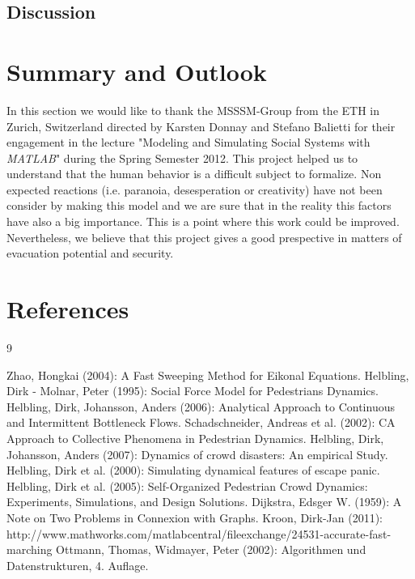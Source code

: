 \documentclass[11pt]{article}
\begin{document}

\subsection{Discussion}


\section{Summary and Outlook}

In this section we would like to thank the MSSSM-Group from the ETH in Zurich, Switzerland
directed by Karsten Donnay and Stefano Balietti for their engagement in the lecture
"Modeling and Simulating Social Systems with \textit{MATLAB}" during the Spring Semester 2012.
This project helped us to understand that the human behavior is a difficult subject to formalize.
Non expected reactions (i.e. paranoia, desesperation or creativity) have not been consider by
making this model and we are sure that in the reality this factors have also a big importance.
This is a point where this work could be improved. Nevertheless, we believe that this project
gives a good prespective in matters of evacuation potential and security.



\section{References}

\begin{thebibliography} {9}
	
	 Zhao, Hongkai (2004): A Fast Sweeping Method for Eikonal Equations.
	 Helbling, Dirk - Molnar, Peter (1995): Social Force Model for Pedestrians Dynamics.
	 Helbling, Dirk, Johansson, Anders (2006): Analytical Approach to Continuous and Intermittent Bottleneck Flows.
	 Schadschneider, Andreas et al. (2002): CA Approach to Collective Phenomena in Pedestrian Dynamics.	
	 Helbling, Dirk, Johansson, Anders (2007): Dynamics of crowd disasters: An empirical Study.
	 Helbling, Dirk et al. (2000): Simulating dynamical features of escape panic.
	 Helbling, Dirk et al. (2005): Self-Organized Pedestrian Crowd Dynamics: Experiments, Simulations, and Design Solutions.
	 Dijkstra, Edsger W. (1959): A Note on Two Problems in Connexion with Graphs.
	 Kroon, Dirk-Jan (2011): http://www.mathworks.com/matlabcentral/fileexchange/24531-accurate-fast-marching
	 Ottmann, Thomas, Widmayer, Peter (2002): Algorithmen und Datenstrukturen, 4. Auflage.

\end{thebibliography}
\end{document}
